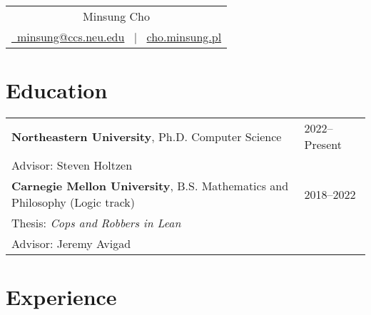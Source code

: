 \documentclass[12pt]{article}
\begin{document}
\pagestyle{empty} 



\begin{tabularx}{\linewidth}{@{} C @{}}
\Huge{Minsung Cho} \\[7.5pt]
\href{mailto:minsung@ccs.neu.edu}{\raisebox{-0.05\height}\ minsung@ccs.neu.edu} \ $|$ \ \href{cho.minsung.pl}{cho.minsung.pl} 
\end{tabularx}

\section{Education}
\begin{tabularx}{\linewidth}{@{}l X@{}}	
\textbf{Northeastern University}, Ph.D. Computer Science & \hfill 2022--Present \\
[3pt]
Advisor: Steven Holtzen\vspace{0.5em}\\
\textbf{Carnegie Mellon University}, B.S. Mathematics and Philosophy (Logic track) & \hfill 2018--2022 \\ 
[3pt]
Thesis: \textit{Cops and Robbers in Lean} \\

Advisor: Jeremy Avigad

\end{tabularx}

\section{Experience}
\end{document}
